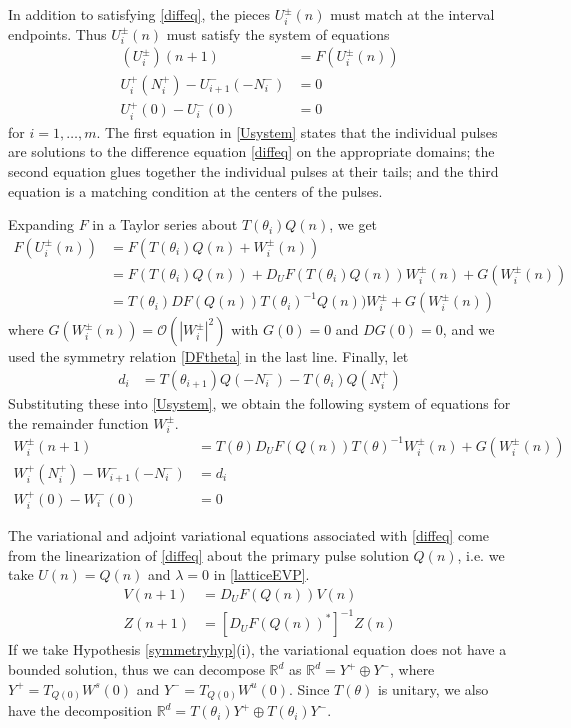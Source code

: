 \documentclass[12pt]{article}
\def\R{{\mathbb R}}
\begin{document}
In addition to satisfying \eqref{diffeq}, the pieces $U_i^\pm(n)$ must match at the interval endpoints. Thus $U_i^\pm(n)$ must satisfy the system of equations
\begin{equation}\label{Usystem}
\begin{aligned}
(U_i^\pm)(n+1) &= F(U_i^\pm(n))  \\
U_i^+(N_i^+) - U_{i+1}^-(-N_i^-) &= 0 \\
U_i^+(0) - U_i^-(0) &= 0
\end{aligned}
\end{equation}
for $i = 1, \dots, m$. The first equation in \eqref{Usystem} states that the individual pulses are solutions to the difference equation \eqref{diffeq} on the appropriate domains; the second equation glues together the individual pulses at their tails; and the third equation is a matching condition at the centers of the pulses.

Expanding $F$ in a Taylor series about $T(\theta_i) Q(n)$, we get
\begin{align*}
F(U_i^\pm(n)) &= F(T(\theta_i) Q(n) + W_i^\pm(n)) \\
&= F(T(\theta_i) Q(n)) + D_U F(T(\theta_i) Q(n)) W_i^\pm(n) + G(W_i^\pm(n)) \\
&= T(\theta_i)DF(Q(n))T(\theta_i)^{-1} Q(n)) W_i^\pm + G(W_i^\pm(n))
\end{align*}
where $G(W_i^\pm(n)) = \mathcal{O}(|W_i^\pm|^2)$ with $G(0) = 0$ and $DG(0) = 0$, and we used the symmetry relation \eqref{DFtheta} in the last line. Finally, let
\begin{align} \label{didef}
d_i &= T(\theta_{i+1}) Q(-N_i^-) - T(\theta_i) Q(N_i^+)
\end{align}
Substituting these into \eqref{Usystem}, we obtain the following system of equations for the remainder function $W_i^\pm$.
\begin{align}
W_i^\pm(n+1) &= T(\theta)D_U F(Q(n))T(\theta)^{-1} W_i^\pm(n) + G(W_i^\pm(n)) \label{Wsystem1} \\
W_i^+(N_i^+) - W_{i+1}^-(-N_i^-) &= d_i \label{Wsystem2} \\
W_i^+(0) - W_i^-(0) &= 0 \label{Wsystem3}
\end{align}

The variational and adjoint variational equations associated with \eqref{diffeq} come from the linearization of \eqref{diffeq} about the primary pulse solution $Q(n)$, i.e. we take $U(n) = Q(n)$ and $\lambda = 0$ in \eqref{latticeEVP}.
\begin{align}
V(n+1) &= D_U F(Q(n)) V(n) \label{vareq} \\
Z(n+1) &= [D_U F(Q(n))^*]^{-1} Z(n) \label{adjvareq} 
\end{align}
If we take Hypothesis \ref{symmetryhyp}(i), the variational equation does not have a bounded solution, thus we can decompose $\R^d$ as $\R^d = Y^+ \oplus Y^-$, where $Y^+ = T_{Q(0)} W^s(0)$ and $Y^- = T_{Q(0)} W^u(0)$. Since $T(\theta)$ is unitary, we also have the decomposition $\R^d = T(\theta_i) Y^+ \oplus T(\theta_i) Y^-$.
\end{document}
